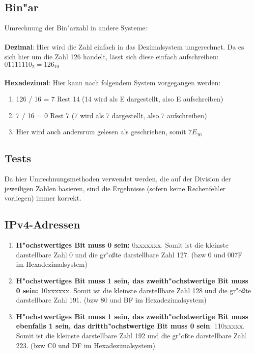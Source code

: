 \documentclass[a4paper,11pt,titlepage]{article}
\begin{document}
    \subsection{Bin"ar}
    Umrechnung der Bin"arzahl in andere Systeme: \\ \\
    \noindent \textbf{Dezimal}: Hier wird die Zahl einfach in das Dezimalsystem umgerechnet. Da es sich hier um die Zahl 126 handelt, lässt sich diese einfach aufschreiben:
    $01111110_2 = 126_10$ \\ \\


    \noindent \textbf{Hexadezimal}:
    Hier kann nach folgendem System vorgegangen werden:
    \begin{enumerate}
        \item 126 / 16 = 7 Rest 14 (14 wird als E dargestellt, also E aufschreiben)
        \item 7 / 16 = 0 Rest 7 (7 wird als 7 dargestellt, also 7 aufschreiben)
        \item Hier wird auch andersrum gelesen als geschrieben, somit $7E_{16}$
    \end{enumerate}

    \subsection{Tests}
    Da hier Umrechnungsmethoden verwendet werden, die auf der Division der jeweiligen Zahlen basieren, sind die Ergebnisse (sofern keine Rechenfehler vorliegen) immer korrekt.

    \subsection{IPv4-Adressen}
    \begin{enumerate}
        \item \textbf{H"ochstwertiges Bit muss 0 sein:} 0xxxxxxx. Somit ist die kleinste darstellbare Zahl 0 und die gr"oßte darstellbare Zahl 127. (bzw 0 und 007F im Hexadezimalsystem)
        \item  \textbf{H"ochstwertiges Bit muss 1 sein, das zweith"ochstwertige Bit muss 0 sein:} 10xxxxxx. Somit ist die kleinste darstellbare Zahl 128 und die gr"oßte darstellbare Zahl 191. (bzw 80 und BF im Hexadezimalsystem)
        \item \textbf{H"ochstwertiges Bit muss 1 sein, das zweith"ochstwertige Bit muss ebenfalls 1 sein, das dritth"ochstwertige Bit muss 0 sein}: 110xxxxx. Somit ist die kleinste darstellbare Zahl 192 und die gr"oßte darstellbare Zahl 223. (bzw C0 und DF im Hexadezimalsystem)
    \end{enumerate}
\end{document}
